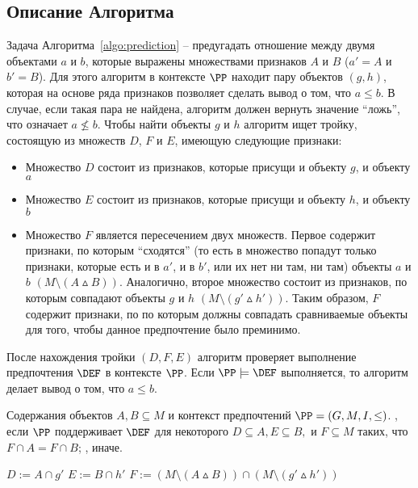 	\subsection{Описание Алгоритма}
	\label{subsec:cp_description}
		Задача Алгоритма~\ref{algo:prediction} – предугадать отношение между двумя объектами $a$ и $b$, которые выражены множествами признаков $A$ и $B$ ($a' = A$ и $b' = B$). Для этого алгоритм в контексте $\PP$ находит пару объектов $(g, h)$, которая на основе ряда признаков позволяет сделать вывод о том, что $a \leq b$. В случае, если такая пара не найдена, алгоритм должен вернуть значение ``ложь'', что означает $a \nleq b$. Чтобы найти объекты $g$ и $h$ алгоритм ищет тройку, состоящую из множеств $D$, $F$ и $E$, имеющую следующие признаки:
		\begin{itemize}
			\item Множество $D$ состоит из признаков, которые присущи и объекту $g$, и объекту $a$
			\item Множество $E$ состоит из признаков, которые присущи и объекту $h$, и объекту $b$
			\item Множество $F$ является пересечением двух множеств. Первое содержит признаки, по которым ``сходятся'' (то есть в множество попадут только признаки, которые есть и в $a'$, и в $b'$, или их нет ни там, ни там) объекты $a$ и $b$ $(M \setminus (A \vartriangle B))$. Аналогично, второе множество состоит из признаков, по которым совпадают объекты $g$ и $h$ $(M \setminus (g' \vartriangle h'))$. Таким образом, $F$ содержит признаки, по по которым должны совпадать сравниваемые объекты для того, чтобы данное предпочтение было преминимо.
		\end{itemize}
		После нахождения тройки $(D,F,E)$ алгоритм проверяет выполнение предпочтения $\DEF$ в контексте $\PP$. Если $\PP \models \DEF$ выполняется, то алгоритм делает вывод о том, что $a \leq b$.
	
		\begin{algorithm}
			\caption{$(A, B, \PP)$ \cite[Алг.~1]{Obiedkov:2013}}
			\label{algo:prediction}
			\begin{algorithmic}[1]
				\REQUIRE Содержания объектов $A, B \subseteq M$ и контекст предпочтений $\PP = (G, M, I, \leq)$.
				\ENSURE \TRUE, если $\PP$ поддерживает $\DEF$ для некоторого $D \subseteq A, E \subseteq B,$ и $F \subseteq M$ таких, что $F \cap A = F \cap B$; \FALSE, иначе.
				\item[]
				\STATE $D := A \cap g'$
				\STATE $E := B \cap h'$
				\STATE $F := (M \setminus (A \vartriangle B)) \cap (M \setminus (g' \vartriangle h'))$
				\IF{$\PP \models \DEF$}
				\RETURN \TRUE
				\ENDIF
				\ENDFOR
				\ENDFOR
				\RETURN \FALSE
			\end{algorithmic}
		\end{algorithm}
		
